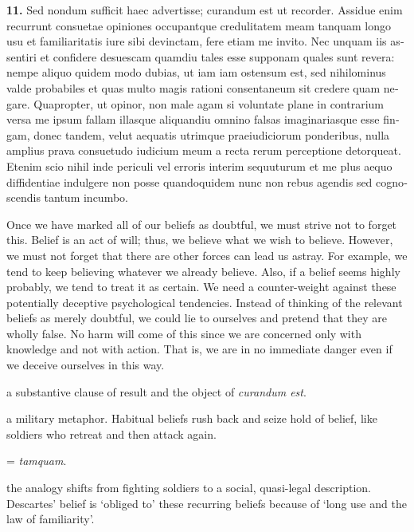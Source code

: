 \clearpage

\beginnumbering
\pstart
\begin{latin}
    \textenglish{\textbf{11.}} Sed nondum sufficit haec advertisse; curandum est ut recorder. Assidue enim recurrunt consuetae opiniones occupantque credulitatem meam tanquam longo usu et familiaritatis iure sibi devinctam, fere etiam me invito. Nec unquam iis assentiri et confidere desuescam quamdiu tales esse supponam quales sunt revera: nempe aliquo quidem modo dubias, ut iam iam ostensum est, sed nihilominus valde probabiles et quas multo magis rationi consentaneum sit credere quam negare. Quapropter, ut opinor, non male agam si voluntate plane in contrarium versa me ipsum fallam illasque aliquandiu omnino falsas imaginariasque esse fingam, donec tandem, velut aequatis utrimque praeiudiciorum ponderibus, nulla amplius prava consuetudo iudicium meum a recta rerum perceptione detorqueat. Etenim scio nihil inde periculi vel erroris interim sequuturum et me plus aequo diffidentiae indulgere non posse quandoquidem nunc non rebus agendis sed cognoscendis tantum incumbo.
\end{latin}
\pend
\endnumbering

\prenotes

Once we have marked all of our beliefs as doubtful, we must strive not to forget this. Belief is an act of will; thus, we believe what we wish to believe. However, we must not forget that there are other forces can lead us astray. For example, we tend to keep believing whatever we already believe. Also, if a belief seems highly probably, we tend to treat it as certain. We need a counter-weight against these potentially deceptive psychological tendencies. Instead of thinking of the relevant beliefs as merely doubtful, we could lie to ourselves and pretend that they are wholly false. No harm will come of this since we are concerned only with knowledge and not with action. That is, we are in no immediate danger even if we deceive ourselves in this way.

 a substantive clause of result and the object of \textit{curandum est}.

 a military metaphor. Habitual beliefs rush back and seize hold of belief, like soldiers who retreat and then attack again.

 = \textit{tamquam}. 

 the analogy shifts from fighting soldiers to a social, quasi-legal description. Descartes' belief is `obliged to' these recurring beliefs because of `long use and the law of familiarity'.

